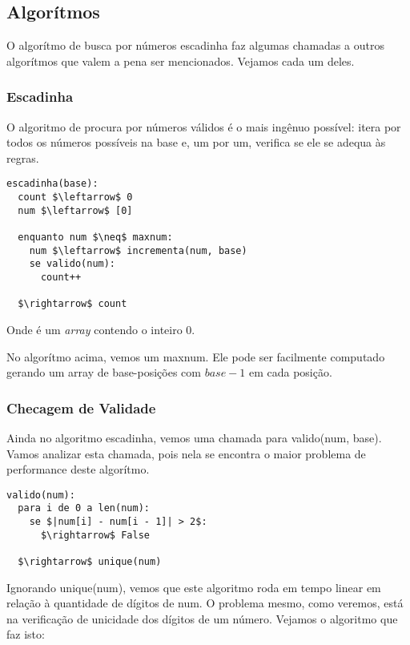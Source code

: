 \documentclass[12pt]{article}
\begin{document}
\subsection{Algorítmos}\label{section:primeira:algoritmos}

O algorítmo de busca por números escadinha faz algumas chamadas a outros algorítmos que valem a pena ser mencionados. Vejamos cada um deles.

\subsubsection{Escadinha}\label{section:primeira:algoritmos:escadinha}
O algoritmo de procura por números válidos é o mais ingênuo possível:
itera por todos os números possíveis na base e, um por um, verifica
se ele se adequa às regras.

\begin{lstlisting}
escadinha(base):
  count $\leftarrow$ 0
  num $\leftarrow$ [0] 
	
  enquanto num $\neq$ maxnum: 
    num $\leftarrow$ incrementa(num, base) 
    se valido(num):
      count++

  $\rightarrow$ count
\end{lstlisting}

Onde {\sf [0]} é um {\em array} contendo o inteiro $0$.


No algorítmo acima, vemos um {\sf maxnum}.
Ele pode ser facilmente computado gerando um array de base-posições
com $base-1$ em cada posição. 

\subsubsection{Checagem de Validade}\label{section:primeira:algoritmos:valido}
Ainda no algoritmo escadinha, vemos uma chamada para {\sf valido(num, base)}.
Vamos analizar esta chamada, pois nela se encontra o maior problema
de performance deste algorítmo.

\begin{lstlisting}
valido(num):
  para i de 0 a len(num):
    se $|num[i] - num[i - 1]| > 2$:
      $\rightarrow$ False

  $\rightarrow$ unique(num)
\end{lstlisting}


Ignorando {\sf unique(num)}, vemos que este algoritmo roda em tempo linear
em relação à quantidade de dígitos de {\sf num}. O problema mesmo, como
veremos, está na verificação de unicidade dos dígitos de um número.
Vejamos o algoritmo que faz isto:
\end{document}

